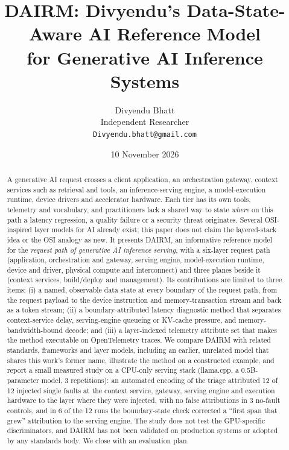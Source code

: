 \documentclass[11pt]{article}
\title{DAIRM: Divyendu's Data-State-Aware AI Reference Model\\
for Generative AI Inference Systems}
\author{Divyendu Bhatt\\
\small Independent Researcher\\
\small \texttt{Divyendu.bhatt@gmail.com}}
\date{10 November 2026}
\begin{document}
\maketitle

\begin{abstract}
A generative AI request crosses a client application, an orchestration gateway, context services such as retrieval and tools, an inference-serving engine, a model-execution runtime, device drivers and accelerator hardware. Each tier has its own tools, telemetry and vocabulary, and practitioners lack a shared way to state \emph{where} on this path a latency regression, a quality failure or a security threat originates. Several OSI-inspired layer models for AI already exist; this paper does not claim the layered-stack idea or the OSI analogy as new. It presents DAIRM, an informative reference model for the \emph{request path of generative AI inference serving}, with a six-layer request path (application, orchestration and gateway, serving engine, model-execution runtime, device and driver, physical compute and interconnect) and three planes beside it (context services, build/deploy and management). Its contributions are limited to three items: (i) a named, observable data state at every boundary of the request path, from the request payload to the device instruction and memory-transaction stream and back as a token stream; (ii) a boundary-attributed latency diagnostic method that separates context-service delay, serving-engine queueing or KV-cache pressure, and memory-bandwidth-bound decode; and (iii) a layer-indexed telemetry attribute set that makes the method executable on OpenTelemetry traces. We compare DAIRM with related standards, frameworks and layer models, including an earlier, unrelated model that shares this work's former name, illustrate the method on a constructed example, and report a small measured study on a CPU-only serving stack (llama.cpp, a 0.5B-parameter model, 3 repetitions): an automated encoding of the triage attributed 12 of 12 injected single faults at the context service, gateway, serving engine and execution hardware to the layer where they were injected, with no false attributions in 3 no-fault controls, and in 6 of the 12 runs the boundary-state check corrected a ``first span that grew'' attribution to the serving engine. The study does not test the GPU-specific discriminators, and DAIRM has not been validated on production systems or adopted by any standards body. We close with an evaluation plan.
\end{abstract}
\end{document}
